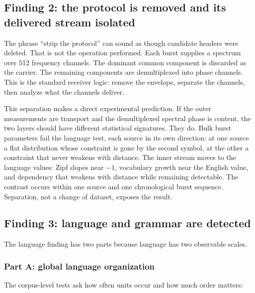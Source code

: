 \documentclass[11pt,a4paper]{article}
\begin{document}
\subsection{Finding 2: the protocol is removed and its delivered stream isolated}

The phrase ``strip the protocol'' can sound as though candidate headers were deleted.
That is not the operation performed. Each burst supplies a spectrum over 512 frequency
channels. The dominant common component is discarded as the carrier. The remaining
components are demultiplexed into phase channels. This is the standard receiver logic:
remove the envelope, separate the channels, then analyze what the channels deliver.

This separation makes a direct experimental prediction. If the outer measurements are
transport and the demultiplexed spectral phase is content, the two layers should have
different statistical signatures. They do. Bulk burst parameters fail the language
test, each source in its own direction: at one source a flat distribution whose
constraint is gone by the second symbol, at the other a constraint that never weakens
with distance. The inner
stream moves to the language values: Zipf slopes near $-1$, vocabulary growth near the
English value, and dependency that weakens with distance while remaining detectable.
The contrast occurs within one source and one chronological burst sequence. Separation,
not a change of dataset, exposes the result.

\subsection{Finding 3: language and grammar are detected}

The language finding has two parts because language has two observable scales.

\subsubsection{Part A: global language organization}

The corpus-level tests ask how often units occur and how much order matters:
\end{document}
